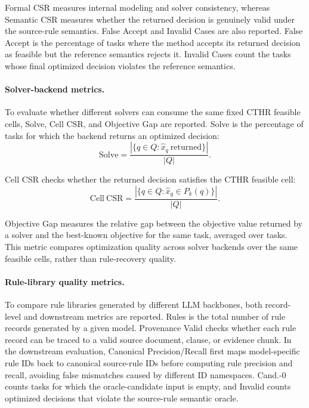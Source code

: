 ﻿\documentclass[a4paper,fleqn]{cas-dc}
\newcommand{\CTHR}{\textsc{CTHR}}
\begin{document}
Formal CSR measures internal modeling and solver consistency, whereas Semantic CSR measures whether the returned decision is genuinely valid under the source-rule semantics. False Accept and Invalid Cases are also reported. False Accept is the percentage of tasks where the method accepts its returned decision as feasible but the reference semantics rejects it. Invalid Cases count the tasks whose final optimized decision violates the reference semantics.

\paragraph{Solver-backend metrics.}
To evaluate whether different solvers can consume the same fixed \CTHR{} feasible cells, Solve, Cell CSR, and Objective Gap are reported. Solve is the percentage of tasks for which the backend returns an optimized decision:
\begin{equation}
\mathrm{Solve}=
\frac{
|\{q\in Q:\hat{x}_q\ \mathrm{returned}\}|
}
{|Q|}.
\end{equation}

Cell CSR checks whether the returned decision satisfies the \CTHR{} feasible cell:
\begin{equation}
\mathrm{Cell\ CSR}=
\frac{
|\{q\in Q:\hat{x}_q\in P_k(q)\}|
}
{|Q|}.
\end{equation}

Objective Gap measures the relative gap between the objective value returned by a solver and the best-known objective for the same task, averaged over tasks. This metric compares optimization quality across solver backends over the same feasible cells, rather than rule-recovery quality.

\paragraph{Rule-library quality metrics.}
To compare rule libraries generated by different LLM backbones, both record-level and downstream metrics are reported. Rules is the total number of rule records generated by a given model. Provenance Valid checks whether each rule record can be traced to a valid source document, clause, or evidence chunk. In the downstream evaluation, Canonical Precision/Recall first maps model-specific rule IDs back to canonical source-rule IDs before computing rule precision and recall, avoiding false mismatches caused by different ID namespaces. Cand.-0 counts tasks for which the oracle-candidate input is empty, and Invalid counts optimized decisions that violate the source-rule semantic oracle.
\end{document}
